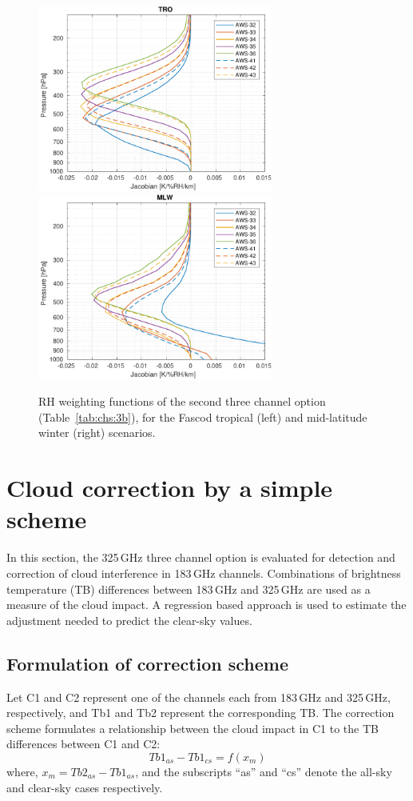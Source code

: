 \documentclass[12pt]{article}
\begin{document}
\begin{figure}[!tb]
  \centering
  \includegraphics[height=61mm]{fascod_3bchopt_tro}\hspace{5mm}%
  \includegraphics[clip,trim=43 0 0 0,height=61mm]{fascod_3bchopt_mlw}
  \caption{RH weighting functions of the second three channel option
    (Table~\ref{tab:chs:3b}), for the Fascod tropical (left) and mid-latitude
    winter (right) scenarios.}
  \label{fig:3bch:prel}
\end{figure}


\section{Cloud correction by a simple scheme}
\label{sec:simple}
%
In this section, the 325\,GHz three channel option is evaluated for detection
and correction of cloud interference in 183\,GHz channels. Combinations of
brightness temperature (TB) differences between 183\,GHz and 325\,GHz are used
as a measure of the cloud impact. A regression based approach is used to
estimate the adjustment needed to predict the clear-sky values.




\subsection{Formulation of correction scheme}
\label{sec:correction:scheme}
%
Let C1 and C2 represent one of the channels each from 183\,GHz and 325\,GHz,
respectively, and Tb1 and Tb2 represent the corresponding TB. The correction
scheme formulates a relationship between the cloud impact in C1 to the TB
differences between C1 and C2:
\begin{equation}
Tb1_{as}-Tb1_{cs} = f(x_m)
\label{eq:TB:diff}
\end{equation}
where, $x_m = Tb2_{as} - Tb1_{as}$, and the subscripts ``as'' and ``cs'' denote the all-sky and clear-sky cases respectively.  
\end{document}

